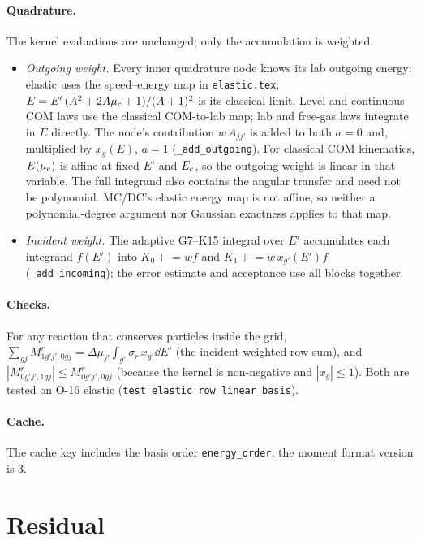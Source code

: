 \documentclass[11pt]{article}
\begin{document}
\paragraph{Quadrature.} The kernel evaluations are unchanged; only the accumulation
is weighted.
\begin{itemize}
  \item \emph{Outgoing weight.} Every inner quadrature node knows its lab outgoing
  energy: elastic uses the speed--energy map in \texttt{elastic.tex};
  $E = E'\,(A^2+2A\mu_{c}+1)/(A+1)^2$ is its classical limit. Level and continuous
  COM laws use the classical COM-to-lab map; lab and free-gas laws integrate in $E$
  directly. The
  node's contribution $w\,A_{jj'}$ is added to both $a=0$ and, multiplied by
  $x_g(E)$, $a=1$ (\texttt{\_add\_outgoing}). For classical COM kinematics,
  $E(\mu_{c})$ is affine at fixed $E'$ and $E_{c}$, so the outgoing weight is linear
  in that variable. The full integrand also contains the angular transfer and
  need not be polynomial. MC/DC's elastic energy map is not affine, so neither
  a polynomial-degree argument nor Gaussian exactness applies to that map.
  \item \emph{Incident weight.} The adaptive G7--K15 integral over $E'$ accumulates
  each integrand $f(E')$ into $K_0 \mathrel{+}= w f$ and
  $K_1 \mathrel{+}= w\,x_{g'}(E') f$ (\texttt{\_add\_incoming}); the error estimate and
  acceptance use all blocks together.
\end{itemize}

\paragraph{Checks.} For any reaction that conserves particles inside the grid,
$\sum_{gj}M^r_{1g'j',0gj} = \Delta\mu_{j'}\int_{g'}\sigma_r\,x_{g'}\dd E'$ (the
incident-weighted row sum), and $|M^r_{0g'j',1gj}|\le M^r_{0g'j',0gj}$ (because the
kernel is non-negative and $|x_g|\le 1$). Both are tested on O-16 elastic
(\texttt{test\_elastic\_row\_linear\_basis}).

\paragraph{Cache.} The cache key includes the basis order \texttt{energy\_order};
the moment format version is 3.

\section{Residual}
\end{document}
